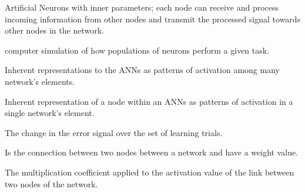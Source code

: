\documentclass{WileySev}
\begin{document}
\begin{acronyms} 
\end{acronyms}
\begin{glossary}
Artificial Neurons with inner parameters; each node can receive and process incoming information from other nodes and transmit the processed signal towards other nodes in the network.

 computer simulation of how populations of neurons perform a given task.

 Inherent representations to the ANNs as patterns of activation among many network's elements.

 Inherent representation of a node within an ANNs as patterns of activation in a single network's element.

 The change in the error signal over the set of learning trials.

 Is the connection between two nodes between a network and have a weight value.

 The multiplication coefficient applied to the activation value of the link between two nodes of the network.

\end{glossary}
\end{document}
